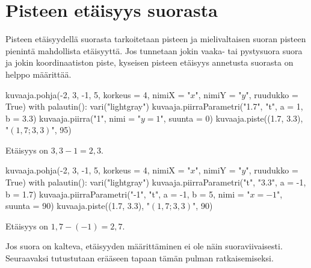 \section{Pisteen etäisyys suorasta}


Pisteen etäisyydellä suorasta tarkoitetaan pisteen ja mielivaltaisen suoran pisteen pienintä mahdollista etäisyyttä.
Jos tunnetaan jokin vaaka- tai pystysuora suora ja jokin koordinaatiston piste, kyseisen pisteen etäisyys annetusta suorasta on helppo määrittää.

\begin{minipage}{0.45\textwidth}
\begin{kuva}
    kuvaaja.pohja(-2, 3, -1, 5, korkeus = 4, nimiX = "$x$", nimiY = "$y$", ruudukko = True)
    with palautin():
        vari("lightgray")
        kuvaaja.piirraParametri("1.7", "t", a = 1, b = 3.3)
    kuvaaja.piirra("1", nimi = "$y=1$", suunta = 0)
    kuvaaja.piste((1.7, 3.3), "$(1,7; 3,3)$", 95)
\end{kuva}

Etäisyys on $3,3-1=2,3$.
\end{minipage}
\begin{minipage}{0.45\textwidth}
\begin{kuva}
    kuvaaja.pohja(-2, 3, -1, 5, korkeus = 4, nimiX = "$x$", nimiY = "$y$", ruudukko = True)
    with palautin():
        vari("lightgray")
        kuvaaja.piirraParametri("t", "3.3", a = -1, b = 1.7)
    kuvaaja.piirraParametri("-1", "t", a = -1, b = 5, nimi = "$x = -1$", suunta = 90)
    kuvaaja.piste((1.7, 3.3), "$(1,7; 3,3)$", 90)
\end{kuva}

Etäisyys on $1,7-(-1)=2,7$.
\end{minipage}

Jos suora on kalteva, etäisyyden määrittäminen ei ole näin suoraviivaisesti.
Seuraavaksi tutustutaan erääseen tapaan tämän pulman ratkaisemiseksi.

